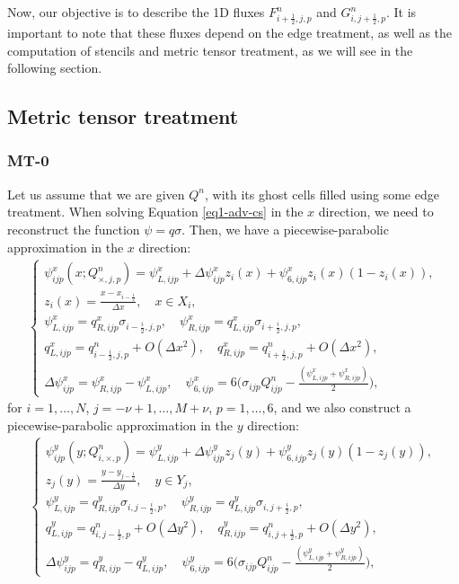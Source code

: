 Now, our objective is to describe the 1D fluxes ${F}_{i+\frac{1}{2},j,p}^n$ and ${G}_{i,j+\frac{1}{2},p}^n$. 
It is important to note that these fluxes depend on the edge treatment, as well as the computation of stencils
and metric tensor treatment, as we will see in the following section.

\subsection{Metric tensor treatment}
\label{mt}
\subsubsection{MT-0}
\label{mt-0}
Let us assume that we are given $Q^n$, with its ghost cells filled using some edge treatment.
When solving Equation \eqref{eq1-adv-cs} in the $x$ direction, we need to reconstruct the function $\psi = q\sigma$.
Then, we have a piecewise-parabolic approximation in the $x$ direction:
\begin{align}
	\label{chp5-ppmx-eq1}
	\begin{cases}
		 \psi_{ijp}^x(x;Q_{\times, j,p}^n) = {\psi}_{L,ijp}^x + \Delta {\psi}_{ijp}^x z_i(x) + {\psi}_{6,ijp}^xz_i(x)(1-z_i(x)), \\
		z_i(x) = \frac{x-x_{i-\frac{1}{2}}}{\Delta x},
		\quad x \in X_i,\\
		\psi_{L,ijp}^x  = q_{R,ijp}^x \sigma_{i-\frac{i}{2},j,p}, \quad
		\psi_{R,ijp}^x  = q_{L,ijp}^x \sigma_{i+\frac{i}{2},j,p}, \\
		q_{L,ijp}^x = q_{i-\frac{i}{2},j,p}^n+ O(\Delta x^2),\quad
		q_{R,ijp}^x = q_{i+\frac{i}{2},j,p}^n+ O(\Delta x^2),\\
		\Delta \psi_{ijp}^x = \psi_{R, ijp}^x - \psi_{L, ijp}^x,\quad
		\psi_{6,ijp}^x = 6\bigg(\sigma_{ijp}Q_{ijp}^n - \frac{(\psi_{L,ijp}^x + \psi_{R,ijp}^x)}{2}\bigg),
	\end{cases}
\end{align}
for $i=1, \ldots, N$, $j=-\nu+1, \ldots, M + \nu$, $p=1,\ldots,6$,
and we also construct a piecewise-parabolic approximation in the $y$ direction:
\begin{align}
	\label{chp5-ppmy-eq2}
	\begin{cases}
		\psi_{ijp}^y(y;Q_{i,\times,p}^n) = \psi_{L,ijp}^y + \Delta \psi_{ijp}^y z_j(y) + \psi_{6,ijp}^yz_j(y)(1-z_j(y)),\\ 
		z_j(y) = \frac{y-y_{j-\frac{1}{2}}}{\Delta y},
		\quad y \in Y_j,\\
		\psi_{L,ijp}^y  = q_{R,ijp}^y \sigma_{i,j-\frac{i}{2},p}, \quad
		\psi_{R,ijp}^y  = q_{L,ijp}^y \sigma_{i,j+\frac{i}{2},p}, \\
		q_{L,ijp}^y = q_{i,j-\frac{1}{2},p}^n+ O(\Delta y^2),\quad
		q_{R,ijp}^y = q_{i,j+\frac{1}{2},p}^n+ O(\Delta y^2),\\
		\Delta \psi_{ijp}^y = q_{R,ijp}^y - q_{L,ijp}^y,\quad 
		\psi_{6,ijp}^y = 6\bigg(\sigma_{ijp}Q_{ijp}^n - \frac{(\psi_{L,ijp}^y + \psi_{R,ijp}^y)}{2}\bigg),
	\end{cases}
\end{align}
